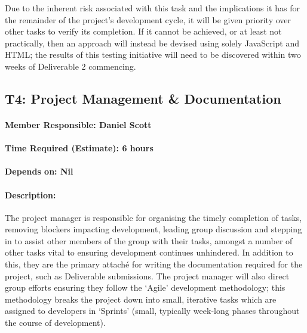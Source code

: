 \documentclass[
  english,
  paper=a4,
  oneside  ,captions=tableheading
]{scrbook}
\begin{document}
Due to the inherent risk associated with this task and the implications
it has for the remainder of the project's development cycle, it will be
given priority over other tasks to verify its completion. If it cannot
be achieved, or at least not practically, then an approach will instead
be devised using solely JavaScript and HTML; the results of this testing
initiative will need to be discovered within two weeks of Deliverable 2
commencing.

\newpage
\hypertarget{t4-project-management-documentation}{%
\subsection{T4: Project Management \&
Documentation}\label{t4-project-management-documentation}}

\hypertarget{member-responsible-daniel-scott}{%
\paragraph{Member Responsible: Daniel
Scott}\label{member-responsible-daniel-scott}}

\hypertarget{time-required-estimate-6-hours}{%
\paragraph{Time Required (Estimate): 6
hours}\label{time-required-estimate-6-hours}}

\hypertarget{depends-on-nil}{%
\paragraph{Depends on: Nil}\label{depends-on-nil}}

\hypertarget{description-2}{%
\paragraph{Description:}\label{description-2}}

The project manager is responsible for organising the timely completion
of tasks, removing blockers impacting development, leading group
discussion and stepping in to assist other members of the group with
their tasks, amongst a number of other tasks vital to ensuring
development continues unhindered. In addition to this, they are the
primary attaché for writing the documentation required for the project,
such as Deliverable submissions. The project manager will also direct
group efforts ensuring they follow the `Agile' development methodology;
this methodology breaks the project down into small, iterative tasks
which are assigned to developers in `Sprints' (small, typically
week-long phases throughout the course of development).
\end{document}
